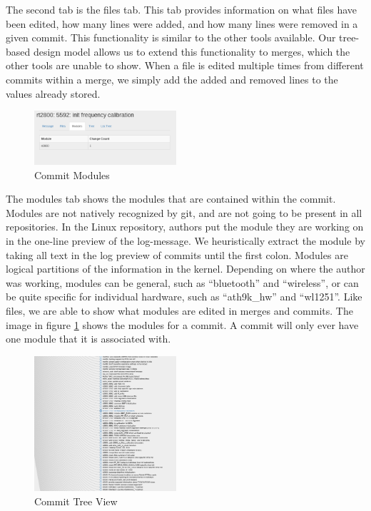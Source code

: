 \documentclass[conference, draftclsnofoot]{IEEEtran}
\begin{document}
The second tab is the files tab. This tab provides information on what files
have been edited, how many lines were added, and how many lines were removed in
a given commit. This functionality is similar to the other tools available. Our
tree-based design model allows us to extend this functionality to merges, which
the other tools are unable to show. When a file is edited multiple times from
different commits within a merge, we simply add the added and removed lines to
the values already stored.\newpage

\begin{figure}[h]
        \centering
        \includegraphics[width=0.47\textwidth]{figures/modules.png}
        \caption{Commit Modules}
        \label{fig:modules}
\end{figure}

The modules tab shows the modules that are contained within the commit. Modules
are not natively recognized by git, and are not going to be present in all
repositories. In the Linux repository, authors put the module they are working
on in the one-line preview of the log-message. We heuristically extract the
module by taking all text in the log preview of commits until the first colon.
Modules are logical partitions of the information in the kernel. Depending on
where the author was working, modules can be general, such as ``bluetooth'' and
``wireless'', or can be quite specific for individual hardware, such as
``ath9k\_hw'' and ``wl1251''. Like files, we are able to show what modules are
edited in merges and commits. The image in figure \ref{fig:modules} shows
the modules for a commit. A commit will only ever have one module that it is
associated with.

\begin{figure}[h]
        \centering
        \includegraphics[width=0.47\textwidth]{figures/tree_view.png}
        \caption{Commit Tree View}
        \label{fig:tree}
\end{figure}
\end{document}

